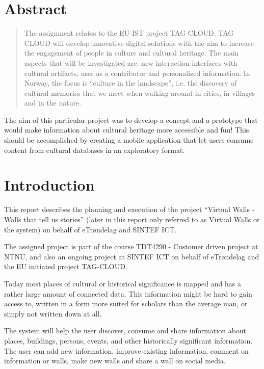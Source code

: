 \documentclass[11pt]{book}
\begin{document}
\color{black}

\chapter{Abstract}
\begin{quotation}\noindent
The assignment relates to the EU-IST project TAG CLOUD. TAG CLOUD will develop innovative digital solutions with the aim to increase the engagement of people in culture and cultural heritage. The main aspects that will be investigated are: new interaction interfaces with cultural artifacts, user as a contributor and personalized information. In Norway, the focus is ``culture in the landscape'', i.e. the discovery of cultural memories that we meet when walking around in cities, in villages and in the nature.  \cite[p. 47]{compendium}
\end{quotation}

The aim of this particular project was to develop a concept and a prototype that would make information about cultural heritage more accessible and fun! This should be accomplished by creating a mobile application that let users consume content from cultural databases in an exploratory format.


\tableofcontents
\listoffigures
\listoftables

\mainmatter
\chapter{Introduction}
This report describes the planning and execution of the project ``Virtual Walls - Walls that tell us stories'' (later in this report only referred to as Virtual Walls or the system) on behalf of eTrøndelag and SINTEF ICT.

The assigned project is part of the course TDT4290 - Customer driven project at NTNU, and also an ongoing project at SINTEF ICT on behalf of eTrøndelag and the EU initiated project TAG-CLOUD.

Today most places of cultural or historical significance is mapped and has a rather large amount of connected data. This information might be hard to gain access to, written in a form more suited for scholars than the average man, or simply not written down at all.

The system will help the user discover, consume and share information about places, buildings, persons, events, and other historically significant information. The user can add new information, improve existing information, comment on information or walls, make new walls and share a wall on social media.
\end{document}
